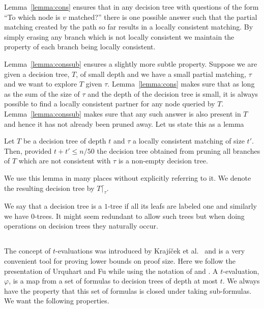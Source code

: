\documentclass{article}\usepackage[a4paper,margin=20mm]{geometry}
\begin{document}
Lemma~\ref{lemma:cons} ensures that in any decision tree with questions of
the form ``To which node is $v$ matched?'' there is one
possible answer such that the partial matching created
by the path so far results in a locally consistent matching.
By simply erasing any branch which is not locally consistent
we maintain the property of each branch being
locally consistent.   

Lemma~\ref{lemma:conssub} ensures a slightly more subtle property.
Suppose we are given a decision tree, $T$,  of small depth and we have
a small partial matching, $\tau$ and we want to explore $T$ given
$\tau$.   Lemma~\ref{lemma:cons} makes sure that as long
as the sum of the size of $\tau$ and the depth of the decision
tree is small, it is always possible to find a locally
consistent partner for any node
queried by $T$.  Lemma~\ref{lemma:conssub} makes sure that 
any such answer is also present in $T$ and hence it has not
already been pruned away.  Let us state this as a lemma

\begin{lemma}\label{lemma:extend}
Let $T$ be a decision tree of depth $t$ and $\tau$
a locally consistent matching of size $t'$.
Then, provided $t+t' \leq n/50$ the
decision tree obtained from pruning all branches
of $T$ which are not consistent with $\tau$
is a non-empty decision tree.
\end{lemma}

We use this lemma in many places without explicitly referring
to it.  We denote the resulting decision tree by $T \lceil_{\tau}$.

We say that a decision tree is a $1$-tree if all its
leafs are labeled one and similarly we have $0$-trees.
It might seem redundant to allow such trees but 
when doing operations on decision trees they naturally occur.

\subsection{}

The concept of $t$-evaluations was introduced by Krajíček et al.\
\cite{KPW95FregePHPExp} and is a very convenient tool for proving
lower bounds on proof size. Here we follow the presentation of Urquhart and Fu
\cite{uf} while using the notation of 
\cite{jhtseitin} and \cite{jhkr}.
A $t$-evaluation, $\varphi$, is a map from a set of formulas to decision 
trees of depth at most $t$.  We always have the property that this
set of formulas is closed under taking sub-formulas.
We want the following properties.
\end{document}

